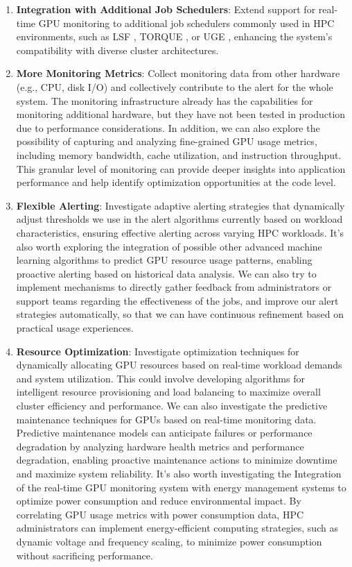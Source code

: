 \begin{enumerate}
    \item \textbf{Integration with Additional Job Schedulers}: Extend support for real-time GPU monitoring to additional job schedulers commonly used in HPC environments, such as LSF \cite{10.1145/3569951.3597564}, TORQUE \cite{10.1145/1188455.1188464}, or UGE \cite{10.1145/3332186.3338408}, enhancing the system's compatibility with diverse cluster architectures.
    \item \textbf{More Monitoring Metrics}: Collect monitoring data from other hardware (e.g., CPU, disk I/O) and collectively contribute to the alert for the whole system. The monitoring infrastructure already has the capabilities for monitoring additional hardware, but they have not been tested in production due to performance considerations. In addition, we can also explore the possibility of capturing and analyzing fine-grained GPU usage metrics, including memory bandwidth, cache utilization, and instruction throughput. This granular level of monitoring can provide deeper insights into application performance and help identify optimization opportunities at the code level.
    \item \textbf{Flexible Alerting}: Investigate adaptive alerting strategies that dynamically adjust thresholds we use in the alert algorithms currently based on workload characteristics, ensuring effective alerting across varying HPC workloads. It's also worth exploring the integration of possible other advanced machine learning algorithms to predict GPU resource usage patterns, enabling proactive alerting based on historical data analysis. We can also try to implement mechanisms to directly gather feedback from administrators or support teams regarding the effectiveness of the jobs, and improve our alert strategies automatically, so that we can have continuous refinement based on practical usage experiences.
    \item \textbf{Resource Optimization}: Investigate optimization techniques for dynamically allocating GPU resources based on real-time workload demands and system utilization. This could involve developing algorithms for intelligent resource provisioning and load balancing to maximize overall cluster efficiency and performance. We can also investigate the predictive maintenance techniques for GPUs based on real-time monitoring data. Predictive maintenance models can anticipate failures or performance degradation by analyzing hardware health metrics and performance degradation, enabling proactive maintenance actions to minimize downtime and maximize system reliability. It's also worth investigating the Integration of the real-time GPU monitoring system with energy management systems to optimize power consumption and reduce environmental impact. By correlating GPU usage metrics with power consumption data, HPC administrators can implement energy-efficient computing strategies, such as dynamic voltage and frequency scaling, to minimize power consumption without sacrificing performance.
\end{enumerate}
